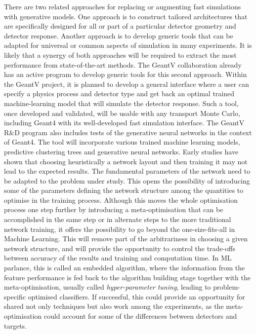 \documentclass[12pt,a4paper]{article}
\begin{document}
{There are two related approaches for replacing or augmenting fast
simulations with generative models. One approach is to construct
tailored architectures that are specifically designed for all or part of
a particular detector geometry and detector response. Another approach
is to develop generic tools that can be adapted for universal or common
aspects of simulation in many experiments. It is likely that a synergy
of both approaches will be required to extract the most performance from
state-of-the-art methods. The GeantV collaboration already has an active
program to develop generic tools for this second approach. Within the
GeantV project, it is planned to develop a general interface where a
user can specify a physics process and detector type and get back an
optimal trained machine-learning model that will simulate the detector
response. Such a tool, once developed and validated, will be usable with
any transport Monte Carlo, including Geant4 with its well-developed fast
simulation interface. The GeantV R\&D program also includes tests of the
generative neural networks in the context of Geant4. The tool will
incorporate various trained machine learning models, predictive
clustering trees and generative neural networks. Early studies have
shown that choosing heuristically a network layout and then training it
may not lead to the expected results. The fundamental parameters of the
network need to be adapted to the problem under study. This opens the
possibility of introducing some of the parameters defining the network
structure among the quantities to optimise in the training process.
Although this moves the whole optimisation process one step further by
introducing a meta-optimisation that can be accomplished in the same
step or in alternate steps to the more traditional network training, it
offers the possibility to go beyond the one-size-fits-all in Machine
Learning. This will remove part of the arbitrariness in choosing a given
network structure, and will provide the opportunity to control the
trade-offs between accuracy of the results and training and computation
time. In ML parlance, this is called an embedded algorithm, where the
information from the feature performance is fed back to the algorithm
building stage together with the meta-optimisation, usually called
\emph{hyper-parameter} \emph{tuning}, leading to problem-specific
optimised classifiers. If successful, this could provide an opportunity
for shared not only techniques but also work among the experiments, as
the meta-optimisation could account for some of the differences between
detectors and targets.

}
\end{document}
